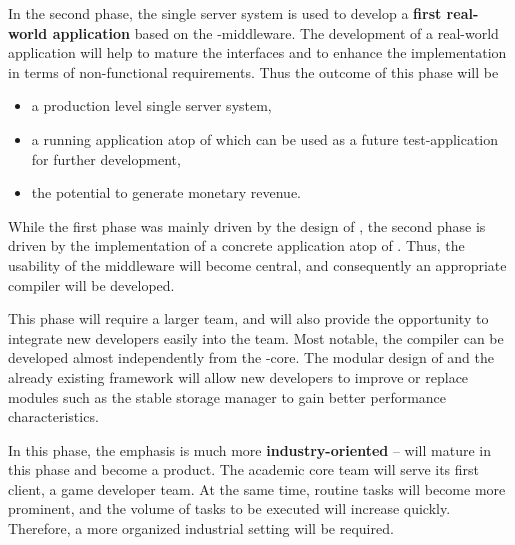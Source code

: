 \documentclass[a4paper, 10pt]{book}
\begin{document}
                                        In the second phase, the single server system is used to develop a
                                        \textbf{first real-world application} based on the \SYNEIGHT-middleware.
                                        The development of a real-world application will help to mature the
                                        interfaces and to enhance the implementation in terms of
                                        non-functional requirements. Thus the outcome of this phase will be
                                        \begin{itemize}
                                            \item a production level single server system,
                                            \item a running application atop of \SYNEIGHT which can be used as a
                                                future test-application for further development,
                                            \item the potential to generate monetary revenue.
                                        \end{itemize}

                                        While the first phase was mainly driven by the design of \SYNEIGHT, the
                                        second phase is driven by the implementation of a concrete application
                                        atop of \SYNEIGHT. Thus, the usability of the middleware will become
                                        central, and consequently an appropriate compiler will be developed.

                                        This phase will require a larger team, and will also provide the
                                        opportunity to integrate new developers easily into the team. Most
                                        notable, the compiler can be developed almost independently from the
                                        \SYNEIGHT-core. The modular design of \SYNEIGHT and the already existing
                                        framework will allow new developers to improve or replace modules such
                                        as the stable storage manager to gain better performance
                                        characteristics.

                                        In this phase, the emphasis is much more \textbf{industry-oriented} --
                                        \SYNEIGHT will mature in this phase and become a product. The academic
                                        core team will serve its first client, a game developer team. At the
                                        same time, routine tasks will become more prominent, and the volume of
                                        tasks to be executed will increase quickly. Therefore, a more
                                        organized industrial setting will be required. 
\end{document}
